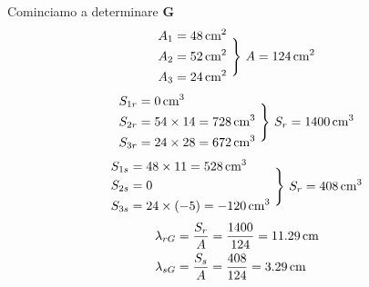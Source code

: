 \noindent Cominciamo a determinare $\mathbf{G}$ 
\begin{equation*}
\begin{aligned}
A_1 &= 48\,\textup{cm}^2 \\
A_2 &= 52\,\textup{cm}^2 \\
A_3 &= 24\,\textup{cm}^2
\end{aligned}
\,\,\Biggr\}\,\, A = 124\,\textup{cm}^2
\end{equation*}
\begin{equation*}
\begin{aligned}
S_{1r} &= 0\,\textup{cm}^3 \\
S_{2r} &= 54\times 14 = 728\,\textup{cm}^3 \\
S_{3r} &= 24\times 28  = 672\,\textup{cm}^3
\end{aligned}
\,\,\Biggr\}\,\, S_r = 1400\,\textup{cm}^3
\end{equation*}
\begin{equation*}
\begin{aligned}
S_{1s} &= 48\times 11 = 528\,\textup{cm}^3 \\
S_{2s} &= 0 \\
S_{3s} &= 24\times (-5)  = -120\,\textup{cm}^3
\end{aligned}
\,\,\Biggr\}\,\, S_r = 408\,\textup{cm}^3
\end{equation*}
\begin{align*}
\lambda_{rG} &= \frac{S_r}{A} = \frac{1400}{124} = 11.29\,\textup{cm} \\
\lambda_{sG} &= \frac{S_s}{A} = \frac{408}{124} = 3.29\,\textup{cm}
\end{align*}
\renewcommand{\thefigure}{4.1~-~2}

